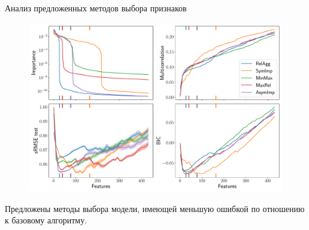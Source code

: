 \documentclass[10pt]{beamer}
\begin{document}
\begin{frame}{Анализ предложенных методов выбора признаков}
	\begin{figure}
		\includegraphics[width=0.9\linewidth]{figs/ecog_3_30_metrics.pdf}
		\vspace{-0.2cm}
	\end{figure}
	Предложены методы выбора модели, имеющей меньшую ошибкой по отношению к базовому алгоритму.
\end{frame}
\end{document}
